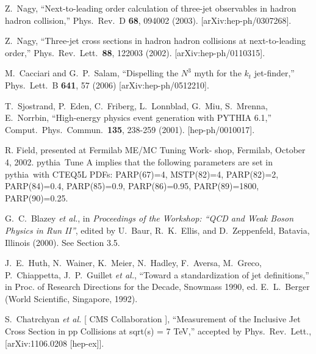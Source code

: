 \documentclass[11pt]{article}
\newcommand{\pythia}{{\sc pythia}}
\begin{document}
\begin{thebibliography}{99}
  Z.~Nagy,
   ``Next-to-leading order calculation of three-jet observables in hadron
  hadron collision,''
  Phys.\ Rev.\ D {\bf 68}, 094002 (2003).
  [arXiv:hep-ph/0307268].


  Z.~Nagy,
   ``Three-jet cross sections in hadron hadron collisions at next-to-leading
  order,''
  Phys.\ Rev.\ Lett.\  {\bf 88}, 122003 (2002).
  [arXiv:hep-ph/0110315].


  M.~Cacciari and G.~P.~Salam,
  ``Dispelling the $N^{3}$ myth for the $k_t$ jet-finder,''
  Phys.\ Lett.\  B {\bf 641}, 57 (2006)
  [arXiv:hep-ph/0512210].


  T.~Sjostrand, P.~Eden, C.~Friberg, L.~Lonnblad, G.~Miu, 
        S.~Mrenna, E.~Norrbin,
  ``High-energy physics event generation with PYTHIA 6.1,''
  Comput.\ Phys.\ Commun.\  {\bf 135}, 238-259 (2001).
  [hep-ph/0010017].


  R. Field, presented at Fermilab ME/MC Tuning Work-
  shop, Fermilab, October 4, 2002. 
  \pythia\ Tune A implies
  that the following parameters are set in \pythia\ with
  CTEQ5L PDFs: PARP(67)=4, MSTP(82)=4, PARP(82)=2,
  PARP(84)=0.4,      PARP(85)=0.9,      PARP(86)=0.95,
  PARP(89)=1800, PARP(90)=0.25.


 G.~C.~Blazey {\it et al.}, in
     {\sl Proceedings of the Workshop:
     ``QCD and Weak Boson Physics in Run II''},
     edited by U.~Baur, R.~K.~Ellis, and D.~Zeppenfeld, 
     Batavia, Illinois  (2000).
     See Section 3.5.

  J.~E.~Huth, N.~Wainer, K.~Meier, N.~Hadley, F.~Aversa, M.~Greco, P.~Chiappetta, J.~P.~Guillet {\it et al.},
  ``Toward a standardization of jet definitions,''
  in Proc. of Research Directions for the Decade, Snowmass 1990, ed.
     E.~L.~Berger (World Scientific, Singapore, 1992).







  S.~Chatrchyan {\it et al.} [ CMS Collaboration ],
  ``Measurement of the Inclusive Jet Cross Section in pp Collisions at sqrt(s) = 7 TeV,'' accepted by Phys.~Rev.~Lett.,
  [arXiv:1106.0208 [hep-ex]].



\end{thebibliography}
\end{document}
